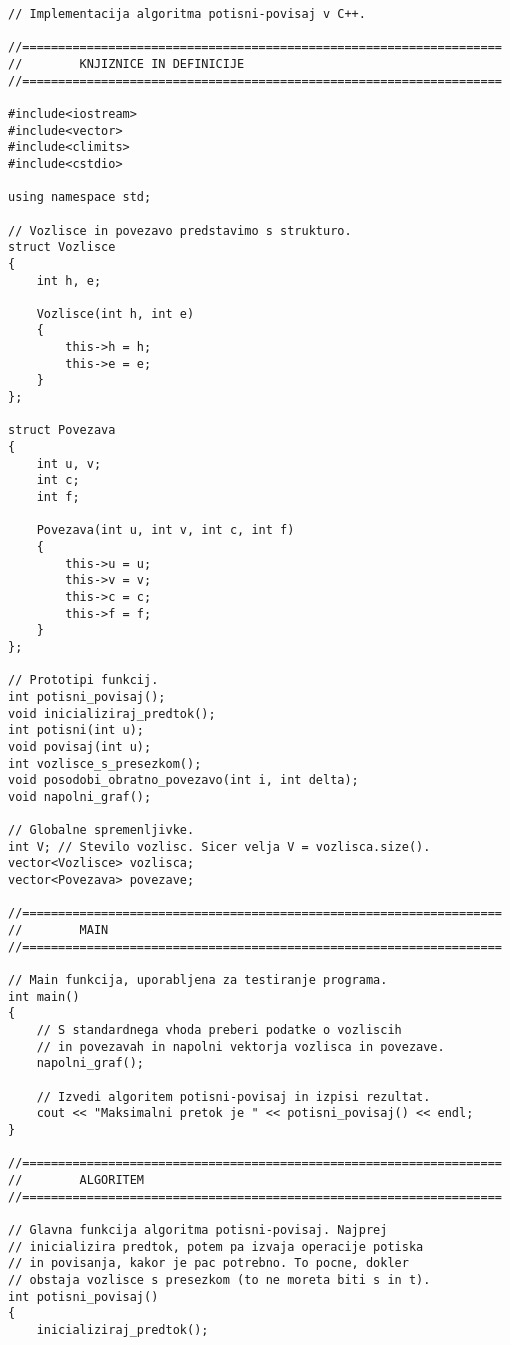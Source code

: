 \documentclass[mat1]{fmfdelo}
\begin{document}
\begin{verbatim}
// Implementacija algoritma potisni-povisaj v C++.

//===================================================================
//        KNJIZNICE IN DEFINICIJE
//===================================================================

#include<iostream>
#include<vector>
#include<climits>
#include<cstdio>

using namespace std;

// Vozlisce in povezavo predstavimo s strukturo.
struct Vozlisce
{
    int h, e;
    
    Vozlisce(int h, int e)
    {
        this->h = h;
        this->e = e;
    }
};

struct Povezava
{
    int u, v;
    int c;
    int f;
    
    Povezava(int u, int v, int c, int f)
    {
        this->u = u;
        this->v = v;
        this->c = c;
        this->f = f;
    }
};

// Prototipi funkcij.
int potisni_povisaj();
void inicializiraj_predtok();
int potisni(int u);
void povisaj(int u);
int vozlisce_s_presezkom();
void posodobi_obratno_povezavo(int i, int delta);
void napolni_graf();

// Globalne spremenljivke.
int V; // Stevilo vozlisc. Sicer velja V = vozlisca.size().
vector<Vozlisce> vozlisca;
vector<Povezava> povezave;

//===================================================================
//        MAIN
//===================================================================

// Main funkcija, uporabljena za testiranje programa.
int main()
{
    // S standardnega vhoda preberi podatke o vozliscih
    // in povezavah in napolni vektorja vozlisca in povezave.
    napolni_graf();
    
    // Izvedi algoritem potisni-povisaj in izpisi rezultat.
    cout << "Maksimalni pretok je " << potisni_povisaj() << endl;
}

//===================================================================
//        ALGORITEM
//===================================================================

// Glavna funkcija algoritma potisni-povisaj. Najprej
// inicializira predtok, potem pa izvaja operacije potiska
// in povisanja, kakor je pac potrebno. To pocne, dokler
// obstaja vozlisce s presezkom (to ne moreta biti s in t).
int potisni_povisaj()
{
    inicializiraj_predtok();
    

\end{verbatim}
\end{document}
